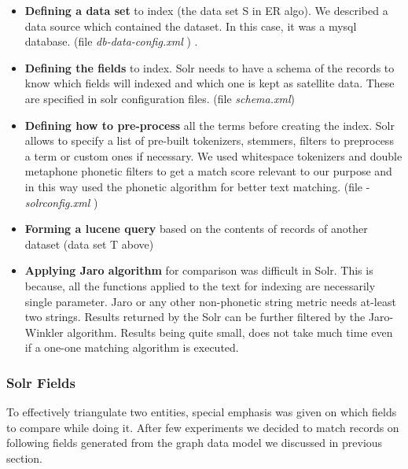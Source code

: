\begin{itemize}

        \item \textbf{Defining a data set} to index  (the data set S in ER algo). We described a data source which contained the dataset. In this case, it was a mysql database. (file \emph{ db-data-config.xml }) .
        
        \item \textbf{Defining the fields} to index. Solr needs to have a schema of the records to know which fields will indexed and which one is kept as satellite data. These are specified in solr configuration files. (file \emph{schema.xml})

        \item \textbf{Defining how to pre-process} all the terms before creating the index. Solr allows to specify a list of pre-built tokenizers, stemmers, filters to preprocess a term or custom ones if necessary. We used whitespace tokenizers and double metaphone phonetic filters to get a match score relevant to our purpose and in this way used the phonetic algorithm for better text matching. (file - \emph{ solrconfig.xml })
        
        \item \textbf{ Forming a lucene query } based on the contents of records of another dataset (data set T above)
        
        \item \textbf{ Applying Jaro algorithm } for comparison was difficult in Solr. This is because, all the functions applied to the text for indexing are necessarily single parameter. Jaro or any other non-phonetic string metric needs at-least two strings. Results returned by the Solr can be further filtered by the Jaro-Winkler algorithm. Results being quite small, does not take much time even if a one-one matching algorithm is executed. 

\end{itemize}
\subsubsection{Solr Fields}
    To effectively triangulate two entities, special emphasis was given on which fields to compare while doing it. After few experiments we decided to match records on following fields generated from the graph data model we discussed in previous section.

